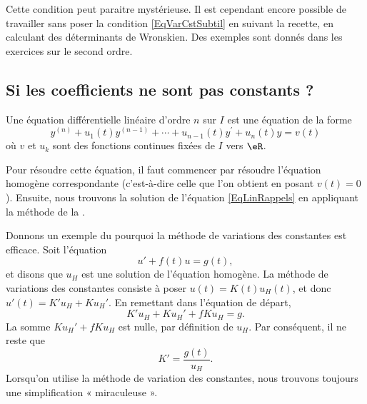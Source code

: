 Cette condition peut paraitre mystérieuse. Il est cependant encore possible de travailler sans poser la condition \eqref{EqVarCstSubtil} en suivant la recette, en calculant des déterminants de Wronskien. Des exemples sont donnés dans les exercices sur le second ordre.

\subsection{Si les coefficients ne sont pas constants ?}

Une équation différentielle linéaire d'ordre \( n\) sur \( I\) est une équation de la forme
\begin{equation}	\label{EqLinRappels}
	y^{(n)} + u_1(t) y^{(n-1)} + \cdots + u_{n-1}(t) y^\prime + u_n(t) y = v(t)
\end{equation}
où \( v\) et \( u_k\) sont des fonctions continues fixées de \( I\) vers \( \eR\).

Pour résoudre cette équation, il faut commencer par résoudre l'équation homogène correspondante (c'est-à-dire celle que l'on obtient en posant \( v(t)=0\)). Ensuite, nous trouvons la solution de l'équation \eqref{EqLinRappels} en appliquant la méthode de la .

Donnons un exemple du pourquoi la méthode de variations des constantes est efficace. Soit l'équation
\begin{equation}		\label{EqDiffExempleVarCst}
	u'+f(t)u=g(t),
\end{equation}
et disons que \( u_H\) est une solution de l'équation homogène. La méthode de variations des constantes consiste à poser \( u(t)=K(t)u_H(t)\), et donc \( u'(t)=K'u_H+Ku_H'\). En remettant dans l'équation de départ,
\begin{equation}
	K'u_H+Ku_H'+fKu_H=g.
\end{equation}
La somme \( Ku_H'+fKu_H\) est nulle, par définition de \( u_H\). Par conséquent, il ne reste que
\begin{equation}
	K'=\frac{ g(t) }{ u_H }.
\end{equation}
Lorsqu'on utilise la méthode de variation des constantes, nous trouvons toujours une simplification « miraculeuse ».


